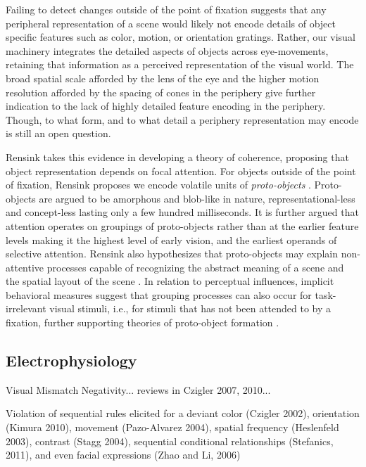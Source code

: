 Failing to detect changes outside of the point of fixation suggests that any peripheral representation of a scene would likely not encode details of object specific features such as color, motion, or orientation gratings.  Rather, our visual machinery integrates the detailed aspects of objects across eye-movements, retaining that information as a perceived representation of the visual world.  The broad spatial scale afforded by the lens of the eye and the higher motion resolution afforded by the spacing of cones in the periphery give further indication to the lack of highly detailed feature encoding in the periphery.  Though, to what form, and to what detail a periphery representation may encode is still an open question.  

Rensink takes this evidence in developing a theory of coherence, proposing that object representation depends on focal attention.  For objects outside of the point of fixation, Rensink proposes we encode volatile units of \textit{proto-objects} \cite{Rensink2000,Rensink2001}.  Proto-objects are argued to be amorphous and blob-like in nature, representational-less and concept-less lasting only a few hundred milliseconds.  It is further argued that attention operates on groupings of proto-objects rather than at the earlier feature levels making it the highest level of early vision, and the earliest operands of selective attention.  Rensink also hypothesizes that proto-objects may explain non-attentive processes capable of recognizing the abstract meaning of a scene and the spatial layout of the scene \cite{Rensink2002}.  In relation to perceptual influences, implicit behavioral measures suggest that grouping processes can also occur for task-irrelevant visual stimuli, i.e., for stimuli that has not been attended to by a fixation, further supporting theories of proto-object formation \cite{Lamy2006}.

\subsection{Electrophysiology}\label{sec:electrophysiology}

Visual Mismatch Negativity... reviews in Czigler 2007, 2010...
\cite{Stefanics2011}

Violation of sequential rules elicited for a deviant color (Czigler 2002), orientation (Kimura 2010), movement (Pazo-Alvarez 2004), spatial frequency (Heslenfeld 2003), contrast (Stagg 2004), sequential conditional relationships (Stefanics, 2011), and even facial expressions (Zhao and Li, 2006)

